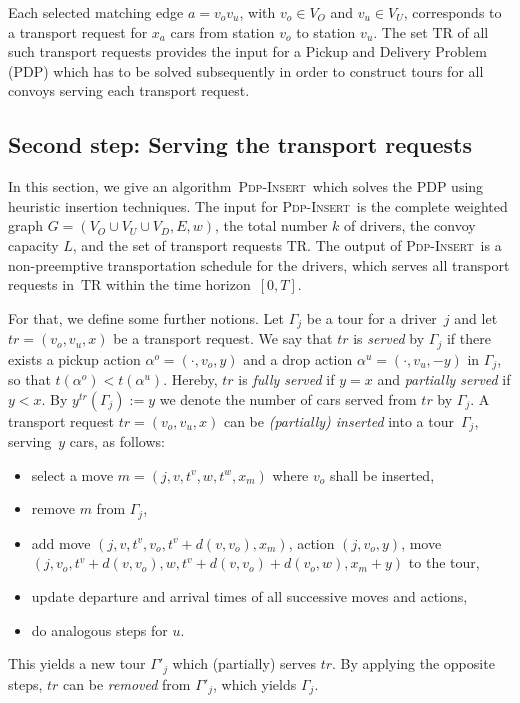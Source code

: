 \documentclass[english]{llncs}
\numberwithin{sublemma}{lemma}
\newcommand{\capd}{\ensuremath{L}}
\newcommand{\tourd}{\ensuremath{\Gamma}}
\newcommand{\action}{\ensuremath{\alpha}}
\newcommand{\aexetime}{\ensuremath{t}}
\newcommand{\move}{\ensuremath{m}}
\newcommand{\dist}{\ensuremath{d}}
\newcommand{\TR}{\mathrm{TR}}
\newcommand{\PDPINSERT}{\textsc{Pdp-Insert}\xspace}
\newcommand{\VO}{V_O}
\newcommand{\VU}{V_U}
\newcommand{\VD}{V_D}
\begin{document}
Each selected matching edge $a = v_ov_u$, with $v_o \in \VO$ and $v_u \in \VU$, corresponds to a transport request for $x_a$ cars from station $v_o$ to station $v_u$.
The set $\TR$ of all such transport requests provides the input for a Pickup and Delivery Problem (PDP) which has to be solved subsequently in order to construct tours for all convoys serving each transport request.



\subsection{Second step: Serving the transport requests}
\label{sec: static: reopt: second step}


In this section, we give an algorithm~\PDPINSERT\ which solves the PDP using heuristic insertion techniques.
The input for \PDPINSERT\ is the complete weighted graph $G=(\VO \cup \VU \cup \VD, E, w)$, the total number $k$ of drivers, the convoy capacity $\capd$, and the set of transport requests $\TR$.
The output of \PDPINSERT\ is a non-preemptive transportation schedule for the drivers, which serves all transport requests in~$\TR$ within the time horizon~$[0,T]$.


For that, we define some further notions.
Let $\tourd_j$ be a tour for a driver~$j$ and let $tr = (v_o, v_u, x)$ be a transport request.
We say that $tr$ is \emph{served} by $\tourd_j$ if there exists a pickup action $\action^o = (\cdot, v_o, y)$ and a drop action $\action^u = (\cdot, v_u, -y)$ in $\tourd_j$,
so that $\aexetime(\action^o) < \aexetime(\action^u)$.
Hereby, $tr$ is \emph{fully served} if $y = x$ and \emph{partially served} if $y < x$.
By $y^{tr}(\tourd_j) := y$ we denote the number of cars served from $tr$ by $\tourd_j$. 
A transport request $tr = (v_o, v_u, x)$ can be \emph{(partially) inserted} into a tour~$\tourd_j$, serving~$y$ cars, as follows:
\begin{itemize}
 \item select a move $\move = (j, v, t^v, w, t^w, x_m)$ where $v_o$ shall be inserted,
 \item remove $\move$ from $\tourd_j$,
 \item add move $(j, v, t^v, v_o, t^v + \dist(v, v_o), x_m)$, action $(j, v_o, y)$, move $(j, v_o, t^v + \dist(v, v_o), w, t^v + \dist(v, v_o) + \dist(v_o, w), x_m + y)$ to the tour,
 \item update departure and arrival times of all successive moves and actions,
 \item do analogous steps for $u$.
\end{itemize}
This yields a new tour $\tourd'_j$ which (partially) serves $tr$.
By applying the opposite steps, $tr$ can be \emph{removed} from $\tourd'_j$, which yields $\tourd_j$.
\end{document}
